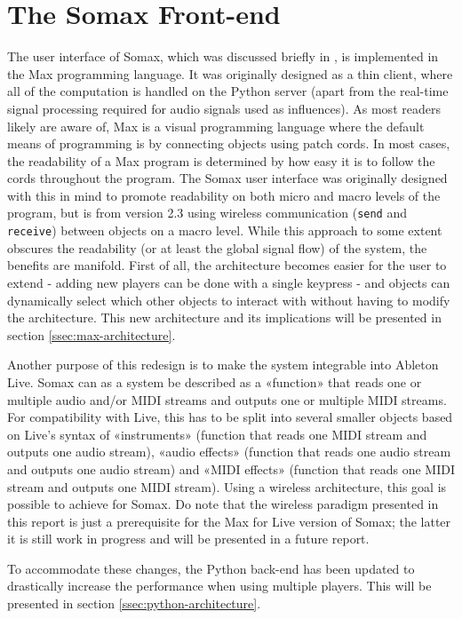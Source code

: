 \section{The Somax Front-end}\label{sec:wireless}
The user interface of Somax, which was discussed briefly in \cite{borg_2019}, is implemented in the Max programming language. It was originally designed as a thin client, where all of the computation is handled on the Python server (apart from the real-time signal processing required for audio signals used as influences). As most readers likely are aware of, Max is a visual programming language where the default means of programming is by connecting objects using patch cords. In most cases, the readability of a Max program is determined by how easy it is to follow the cords throughout the program. The Somax user interface was originally designed with this in mind to promote readability on both micro and macro levels of the program, but is from version 2.3 using wireless communication (\texttt{send} and \texttt{receive}) between objects on a macro level. While this approach to some extent obscures the readability (or at least the global signal flow) of the system, the benefits are manifold. First of all, the architecture becomes easier for the user to extend - adding new players can be done with a single keypress - and objects can dynamically select which other objects to interact with without having to modify the architecture. This new architecture and its implications will be presented in section \ref{ssec:max-architecture}.

Another purpose of this redesign is to make the system integrable into Ableton Live. Somax can as a system be described as a «function» that reads one or multiple audio and/or MIDI streams and outputs one or multiple MIDI streams. For compatibility with Live, this has to be split into several smaller objects based on Live's syntax of «instruments» (function that reads one MIDI stream and outputs one audio stream), «audio effects» (function that reads one audio stream and outputs one audio stream) and «MIDI effects» (function that reads one MIDI stream and outputs one MIDI stream). Using a wireless architecture, this goal is possible to achieve for Somax. Do note that the wireless paradigm presented in this report is just a prerequisite for the Max for Live version of Somax; the latter it is still work in progress and will be presented in a future report.

To accommodate these changes, the Python back-end has been updated to drastically increase the performance when using multiple players. This will be presented in section \ref{ssec:python-architecture}.

